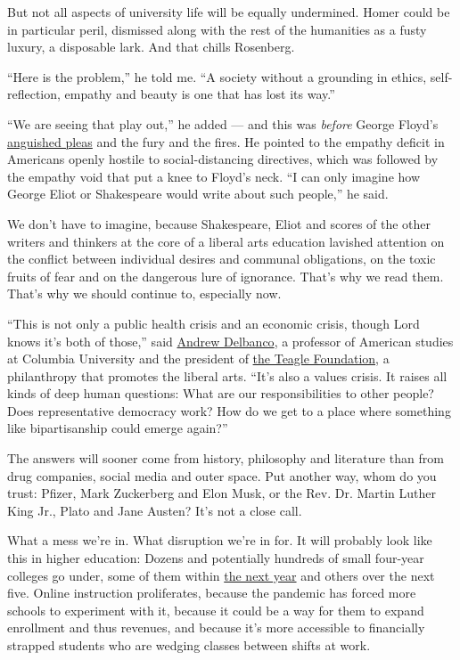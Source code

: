 But not all aspects of university life will be equally undermined. Homer
could be in particular peril, dismissed along with the rest of the
humanities as a fusty luxury, a disposable lark. And that chills
Rosenberg.

``Here is the problem,'' he told me. ``A society without a grounding in
ethics, self-reflection, empathy and beauty is one that has lost its
way.''

``We are seeing that play out,'' he added --- and this was \emph{before}
George Floyd's
\href{https://www.nytimes.com/2020/05/31/us/george-floyd-investigation.html}{anguished
pleas} and the fury and the fires. He pointed to the empathy deficit in
Americans openly hostile to social-distancing directives, which was
followed by the empathy void that put a knee to Floyd's neck. ``I can
only imagine how George Eliot or Shakespeare would write about such
people,'' he said.

We don't have to imagine, because Shakespeare, Eliot and scores of the
other writers and thinkers at the core of a liberal arts education
lavished attention on the conflict between individual desires and
communal obligations, on the toxic fruits of fear and on the dangerous
lure of ignorance. That's why we read them. That's why we should
continue to, especially now.

``This is not only a public health crisis and an economic crisis, though
Lord knows it's both of those,'' said
\href{https://english.columbia.edu/content/andrew-delbanco}{Andrew
Delbanco}, a professor of American studies at Columbia University and
the president of \href{http://www.teaglefoundation.org/Home}{the Teagle
Foundation}, a philanthropy that promotes the liberal arts. ``It's also
a values crisis. It raises all kinds of deep human questions: What are
our responsibilities to other people? Does representative democracy
work? How do we get to a place where something like bipartisanship could
emerge again?''

The answers will sooner come from history, philosophy and literature
than from drug companies, social media and outer space. Put another way,
whom do you trust: Pfizer, Mark Zuckerberg and Elon Musk, or the Rev.
Dr. Martin Luther King Jr., Plato and Jane Austen? It's not a close
call.

What a mess we're in. What disruption we're in for. It will probably
look like this in higher education: Dozens and potentially hundreds of
small four-year colleges go under, some of them within
\href{https://www.wsj.com/articles/coronavirus-pushes-colleges-to-the-breaking-point-forcing-hard-choices-about-education-11588256157}{the
next year} and others over the next five. Online instruction
proliferates, because the pandemic has forced more schools to experiment
with it, because it could be a way for them to expand enrollment and
thus revenues, and because it's more accessible to financially strapped
students who are wedging classes between shifts at work.

